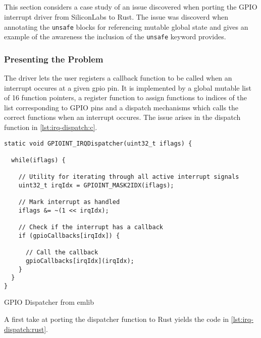 \subsection{}

This section considers a case study of an issue discovered when porting the GPIO interrupt driver from SiliconLabs to Rust.
The issue was discoverd when annotating the \texttt{unsafe} blocks for referencing mutable global state and gives an example of the awareness the inclusion of the \texttt{unsafe} keyword provides.

\subsubsection{Presenting the Problem}

The driver lets the user registers a callback function to be called when an interrupt occures at a given gpio pin.
It is implemented by a global mutable list of 16 function pointers, a register function to assign functions to indices of the list corresponding to GPIO pins and a dispatch mechanisms which calls the correct functions when an interrupt occures.
The issue arises in the dispatch function in \autoref{lst:irq-dispatch:c}.

\begin{listing}
  \begin{verbatim}
static void GPIOINT_IRQDispatcher(uint32_t iflags) {

  while(iflags) {

    // Utility for iterating through all active interrupt signals
    uint32_t irqIdx = GPIOINT_MASK2IDX(iflags);

    // Mark interrupt as handled
    iflags &= ~(1 << irqIdx);

    // Check if the interrupt has a callback
    if (gpioCallbacks[irqIdx]) {

      // Call the callback
      gpioCallbacks[irqIdx](irqIdx);
    }
  }
}
  \end{verbatim}
  \caption{GPIO Dispatcher from emlib}
  \label{lst:irq-dispatch:c}
\end{listing}

A first take at porting the dispatcher function to Rust yields the code in \autoref{lst:irq-dispatch:rust}.

